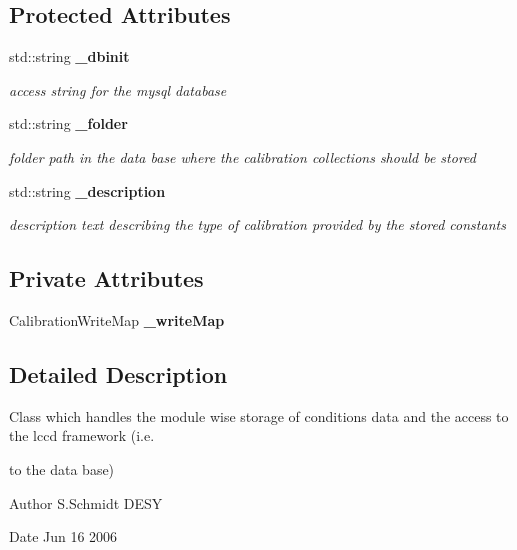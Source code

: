 \subsection*{Protected Attributes}
\begin{DoxyCompactItemize}
\item 
std\-::string {\bf \-\_\-dbinit}\label{classCALICE_1_1CalibrationWriter_adbf1bd238e3c2be0a0d37415374ef407}

\begin{DoxyCompactList}\small\item\em access string for the mysql database \end{DoxyCompactList}\item 
std\-::string {\bf \-\_\-folder}\label{classCALICE_1_1CalibrationWriter_afdcbcda9534dc8b34ef8f326c540cf2d}

\begin{DoxyCompactList}\small\item\em folder path in the data base where the calibration collections should be stored \end{DoxyCompactList}\item 
std\-::string {\bf \-\_\-description}\label{classCALICE_1_1CalibrationWriter_a16bade2368e36f698a37bcf65e8b6be9}

\begin{DoxyCompactList}\small\item\em description text describing the type of calibration provided by the stored constants \end{DoxyCompactList}\end{DoxyCompactItemize}
\subsection*{Private Attributes}
\begin{DoxyCompactItemize}
\item 
Calibration\-Write\-Map {\bfseries \-\_\-write\-Map}\label{classCALICE_1_1CalibrationWriter_a49641e6331fa8be1b3c2f561879fa647}

\end{DoxyCompactItemize}


\subsection{Detailed Description}
Class which handles the module wise storage of conditions data and the access to the lccd framework (i.\-e. 

to the data base) \begin{DoxyAuthor}{Author}
S.\-Schmidt D\-E\-S\-Y 
\end{DoxyAuthor}
\begin{DoxyDate}{Date}
Jun 16 2006 
\end{DoxyDate}


